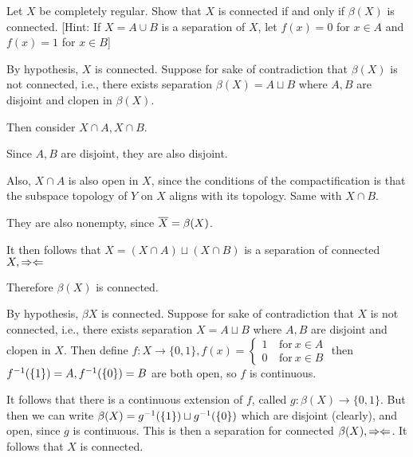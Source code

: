 \documentclass[a4paper, 10pt]{article}
\begin{document}
\begin{problem} [38.6]
    Let $X$ be completely regular. Show that $X$ is connected if and only if $\beta(X)$ is connected. [Hint: If $X = A \cup B$ is a separation of $X$, let $f(x) = 0$ for $x \in A$ and $f(x) = 1$ for $x \in B$]
\end{problem}
\begin{solution}
    \pffwd By hypothesis, $X$ is connected. Suppose for sake of contradiction that $\beta(X)$ is not connected, i.e., there exists separation $\beta(X) = A \sqcup B$ where $A, B$ are disjoint and clopen in $\beta(X)$. 

    Then consider $X \cap A, X \cap B$.

    Since $A, B$ are disjoint, they are also disjoint.

    Also, $X \cap A$ is also open in $X$, since the conditions of the compactification is that the subspace topology of $Y$ on $X$ aligns with its topology. Same with $X \cap B$.

    They are also nonempty, since $\overline{X} = \beta(X)$.
    
    It then follows that $X = (X \cap A) \sqcup (X \cap B)$ is a separation of connected $X, \Rightarrow\Leftarrow$

    Therefore $\beta(X)$ is connected.

    \pfbwd By hypothesis, $\beta X$ is connected. Suppose for sake of contradiction that $X$ is not connected, i.e., there exists separation $X = A \sqcup B$ where $A, B$ are disjoint and clopen in $X$. 
    Then define $f: X \to \{0, 1\}, f(x) = \begin{cases}
    1 & \:\text{for}\: x \in A \\
    0 & \:\text{for}\: x \in B
    \end{cases}$
    then ${f}^{-1}(\{1\}) = A, {f}^{-1}(\{0\}) = B$ are both open, so $f$ is continuous.

    It follows that there is a continuous extension of $f$, called $g: \beta(X) \to \{0, 1\}$. But then we can write $\beta(X) = {g}^{-1}(\{1\}) \sqcup {g}^{-1}(\{0\})$ which are disjoint (clearly), and open, since $g$ is continuous. This is then a separation for connected $\beta(X), \Rightarrow\Leftarrow$. It follows that $X$ is connected.
\end{solution}
\end{document}

